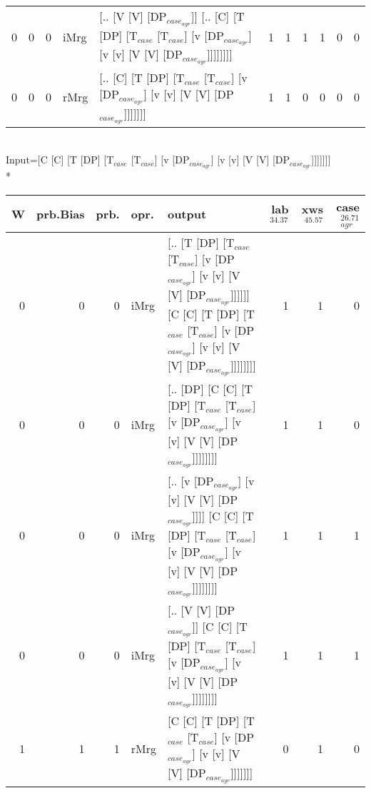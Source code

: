 \begin{tabularx}{\linewidth}{rrrlXrrrrrr}
   0 &       0 &   0 & iMrg & [.. [V [V] [DP$_{case_{agr}}$]] [.. [C] [T [DP] [T$_{case}$ [T$_{case}$] [v [DP$_{case_{agr}}$] [v [v] [V [V] [DP$_{case_{agr}}$]]]]]]]]                                                      &             1 &             1 &                  1 &            1 &              0 &              0 \\
   0 &       0 &   0 & rMrg & [.. [C] [T [DP] [T$_{case}$ [T$_{case}$] [v [DP$_{case_{agr}}$] [v [v] [V [V] [DP$_{case_{agr}}$]]]]]]]                                                                                 &             1 &             1 &                  0 &            0 &              0 &              0 \\
\hline
\end{tabularx}\endgroup\\
\begingroup\scriptsize Input=[C [C] [T [DP] [T$_{case}$ [T$_{case}$] [v [DP$_{case_{agr}}$] [v [v] [V [V] [DP$_{case_{agr}}$]]]]]]]\\*
\begin{tabularx}{\linewidth}{rrrlXrrr}
\hline
   W &   prb.Bias &   prb. & opr.   & output                                                                                                                                                             &   lab$^{34.37}$ &   xws$^{45.57}$ &   case$_{agr}^{26.71}$ \\
\hline
   0 &       0 &   0 & iMrg & [.. [T [DP] [T$_{case}$ [T$_{case}$] [v [DP$_{case_{agr}}$] [v [v] [V [V] [DP$_{case_{agr}}$]]]]]] [C [C] [T [DP] [T$_{case}$ [T$_{case}$] [v [DP$_{case_{agr}}$] [v [v] [V [V] [DP$_{case_{agr}}$]]]]]]]] &             1 &             1 &                  0 \\
   0 &       0 &   0 & iMrg & [.. [DP] [C [C] [T [DP] [T$_{case}$ [T$_{case}$] [v [DP$_{case_{agr}}$] [v [v] [V [V] [DP$_{case_{agr}}$]]]]]]]]                                                                       &             1 &             1 &                  0 \\
   0 &       0 &   0 & iMrg & [.. [v [DP$_{case_{agr}}$] [v [v] [V [V] [DP$_{case_{agr}}$]]]] [C [C] [T [DP] [T$_{case}$ [T$_{case}$] [v [DP$_{case_{agr}}$] [v [v] [V [V] [DP$_{case_{agr}}$]]]]]]]]                            &             1 &             1 &                  1 \\
   0 &       0 &   0 & iMrg & [.. [V [V] [DP$_{case_{agr}}$]] [C [C] [T [DP] [T$_{case}$ [T$_{case}$] [v [DP$_{case_{agr}}$] [v [v] [V [V] [DP$_{case_{agr}}$]]]]]]]]                                                      &             1 &             1 &                  1 \\
   1 &       1 &   1 & rMrg & [C [C] [T [DP] [T$_{case}$ [T$_{case}$] [v [DP$_{case_{agr}}$] [v [v] [V [V] [DP$_{case_{agr}}$]]]]]]]                                                                                 &             0 &             1 &                  0 \\
\hline
\end{tabularx}\endgroup\\

